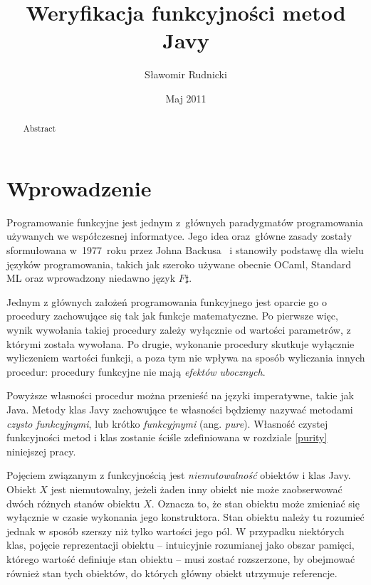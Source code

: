 \documentclass{pracamgr}
\author{Sławomir Rudnicki}
\title{Weryfikacja funkcyjności metod Javy}
\date{Maj 2011}
\begin{document}
\maketitle

\begin{abstract}
  Abstract %
\end{abstract}

\tableofcontents

\chapter*{Wprowadzenie}

Programowanie funkcyjne jest jednym z~głównych paradygmatów
programowania używanych we współczesnej informatyce. Jego idea
oraz~główne zasady zostały sformułowana w~1977~roku przez Johna
Backusa~\cite{backus} i stanowiły podstawę dla wielu języków
programowania, takich jak szeroko używane obecnie OCaml, Standard ML
oraz wprowadzony niedawno język $F\sharp$.

Jednym z głównych założeń programowania funkcyjnego jest oparcie go o
procedury zachowujące się tak jak funkcje matematyczne. Po pierwsze
więc, wynik wywołania takiej procedury zależy wyłącznie od wartości
parametrów, z którymi została wywołana. Po drugie, wykonanie procedury
skutkuje wyłącznie wyliczeniem wartości funkcji, a poza tym nie wpływa
na sposób wyliczania innych procedur: procedury funkcyjne nie mają
\emph{efektów ubocznych}.

Powyższe własności procedur można przenieść na języki imperatywne,
takie jak Java. Metody klas Javy zachowujące te własności będziemy
nazywać metodami \emph{czysto funkcyjnymi}, lub krótko
\emph{funkcyjnymi} (ang. \emph{pure}). Własność czystej
funkcyjności metod i klas zostanie ściśle zdefiniowana w rozdziale
\ref{purity} niniejszej pracy.

Pojęciem związanym z funkcyjnością jest \emph{niemutowalność} obiektów
i klas Javy.  Obiekt $X$ jest niemutowalny, jeżeli żaden inny obiekt
nie może zaobserwować dwóch różnych stanów obiektu $X$. Oznacza to, że
stan obiektu może zmieniać się wyłącznie w czasie wykonania jego
konstruktora. Stan obiektu należy tu rozumieć jednak w sposób szerszy
niż tylko wartości jego pól. W przypadku niektórych klas, pojęcie
reprezentacji obiektu -- intuicyjnie rozumianej jako obszar pamięci,
którego wartość definiuje stan obiektu -- musi zostać rozszerzone, by
obejmować również stan tych obiektów, do których główny obiekt
utrzymuje referencje.
\end{document}
